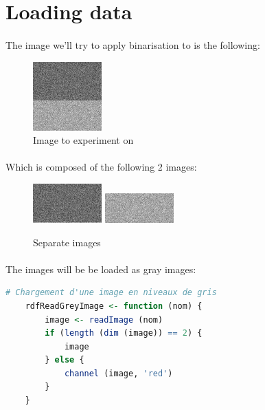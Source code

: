 \section{Loading data}
\paragraph{}
The image we'll try to apply binarisation to is the following:

\begin{figure}[h]
    \centering
    \includegraphics{2classes_100_100_8bits_2016.png}
    \caption{Image to experiment on}
    \label{merged-image}
\end{figure}

\paragraph{}
Which is composed of the following 2 images:

\begin{figure}[h]
    \centering
    \includegraphics{2classes_100_100_8bits_omega1_2016.png}
    \includegraphics{2classes_100_100_8bits_omega2_2016.png}
    \caption{Separate images}
    \label{separate-images}
\end{figure}

\paragraph{}
The images will be be loaded as gray images:

\begin{lstlisting}[language=R, caption=Loading data in R]
    # Chargement d'une image en niveaux de gris
    rdfReadGreyImage <- function (nom) {
        image <- readImage (nom)
        if (length (dim (image)) == 2) {
            image
        } else {
            channel (image, 'red')
        }
    }   
\end{lstlisting}


